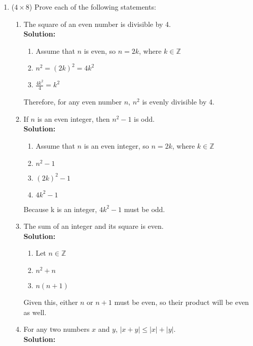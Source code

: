 \documentclass[12pt]{article}
\begin{document}
\begin{enumerate}
	\newpage
	\item ($4 \times 8$)
	Prove each of the following statements:
	\begin{enumerate}
		\item
		The square of an even number is divisible by 4.\\
		{\bf Solution:}

		\begin{enumerate}
			\item Assume that $n$ is even, so $n = 2k$, where $k \in \mathbb{Z}$
			\item $n^2 = (2k)^2 = 4k^2$
			\item $\frac{4k^2}{4} = k^2$
		\end{enumerate}
		Therefore, for any even number $n$, $n^2$ is evenly divisible by 4.

		\newpage
		\item
		If $n$ is an even integer, then $n^2 - 1$ is odd.\\
		{\bf Solution:}

		\begin{enumerate}
			\item Assume that $n$ is an even integer, so $n = 2k$, where $k \in \mathbb{Z}$
			\item $n^2 - 1$
			\item $(2k)^2 - 1$
			\item $4k^2 - 1$
		\end{enumerate}
		Because k is an integer, $4k^2 - 1$ must be odd.

		\newpage
		\item
		The sum of an integer and its square is even.\\
		{\bf Solution:}


		\begin{enumerate}
			\item Let $n \in \mathbb{Z}$
			\item $n^2 + n$
			\item $n(n + 1)$
		\end{enumerate}
		Given this, either $n$ or $n + 1$ must be even, so their product will be even as well.

		\newpage
		\item
		For any two numbers $x$ and $y$, $|x + y| \leq |x| + |y|$.\\
		{\bf Solution:}


\end{enumerate}
\end{enumerate}
\end{document}
